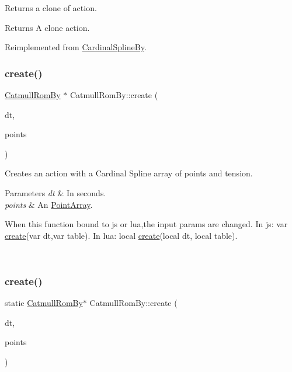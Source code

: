 Returns a clone of action.

\begin{DoxyReturn}{Returns}
A clone action. 
\end{DoxyReturn}


Reimplemented from \hyperlink{classCardinalSplineBy_a35b00381b2823644533fd485817b147e}{Cardinal\+Spline\+By}.

\mbox{\label{classCatmullRomBy_a160dd33d583d05632b51e21e95ccfd9b}} 
\subsubsection{\texorpdfstring{create()}{create()}\hspace{0.1cm}{\footnotesize\ttfamily [1/2]}}
{\footnotesize\ttfamily \hyperlink{classCatmullRomBy}{Catmull\+Rom\+By} $\ast$ Catmull\+Rom\+By\+::create (\begin{DoxyParamCaption}\item[{float}]{dt,  }\item[{\hyperlink{classPointArray}{Point\+Array} $\ast$}]{points }\end{DoxyParamCaption})\hspace{0.3cm}{\ttfamily [static]}}

Creates an action with a Cardinal Spline array of points and tension. 
\begin{DoxyParams}{Parameters}
{\em dt} & In seconds. \\
\hline
{\em points} & An \hyperlink{classPointArray}{Point\+Array}. 
\begin{DoxyCode}
When \textcolor{keyword}{this} \textcolor{keyword}{function} bound to js or lua,the input params are changed.
In js: var \hyperlink{classCatmullRomBy_a160dd33d583d05632b51e21e95ccfd9b}{create}(var dt,var table).
In lua: local \hyperlink{classCatmullRomBy_a160dd33d583d05632b51e21e95ccfd9b}{create}(local dt, local table).
\end{DoxyCode}
 \\
\hline
\end{DoxyParams}
\mbox{\label{classCatmullRomBy_a4a2372ed25deb3f953815767a2ed2df7}} 
\subsubsection{\texorpdfstring{create()}{create()}\hspace{0.1cm}{\footnotesize\ttfamily [2/2]}}
{\footnotesize\ttfamily static \hyperlink{classCatmullRomBy}{Catmull\+Rom\+By}$\ast$ Catmull\+Rom\+By\+::create (\begin{DoxyParamCaption}\item[{float}]{dt,  }\item[{\hyperlink{classPointArray}{Point\+Array} $\ast$}]{points }\end{DoxyParamCaption})\hspace{0.3cm}{\ttfamily [static]}}

